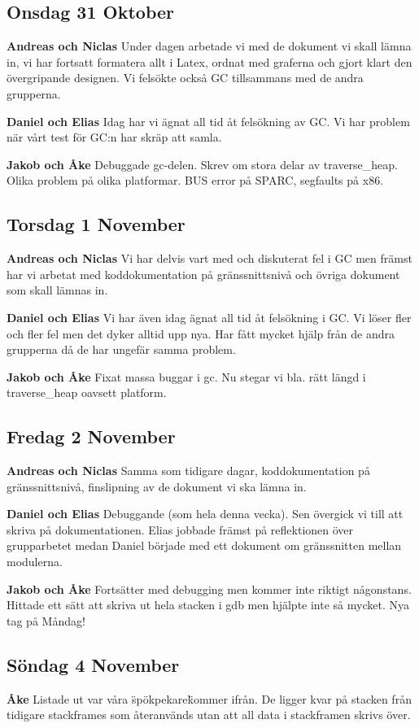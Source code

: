\documentclass{article}
\begin{document}
\subsection{Onsdag 31 Oktober}
{\bf Andreas och Niclas}
Under dagen arbetade vi med de dokument vi skall lämna in, vi har fortsatt formatera allt i Latex, ordnat med graferna och gjort klart den övergripande designen. Vi felsökte också GC tillsammans med de andra grupperna.

{\bf Daniel och Elias}
Idag har vi ägnat all tid åt felsökning av GC. Vi har problem när vårt test för GC:n har skräp att samla.

{\bf Jakob och Åke}
Debuggade gc-delen. Skrev om stora delar av traverse\_heap. Olika problem på olika platformar. BUS error på SPARC, segfaults på x86.

\subsection{Torsdag 1 November}
{\bf Andreas och Niclas} Vi har delvis vart med och diskuterat fel i GC men främst har vi arbetat med koddokumentation på gränssnittsnivå och övriga dokument som skall lämnas in.

{\bf Daniel och Elias} Vi har även idag ägnat all tid åt felsökning i GC. Vi löser fler och fler fel men det dyker alltid upp nya. Har fått mycket hjälp från de andra grupperna då de har ungefär samma problem.

{\bf Jakob och Åke} Fixat massa buggar i gc. Nu stegar vi bla. rätt längd i traverse\_heap oavsett platform.

\subsection{Fredag 2 November}
{\bf Andreas och Niclas} Samma som tidigare dagar, koddokumentation på gränssnittsnivå, finslipning av de dokument vi ska lämna in.

{\bf Daniel och Elias} Debuggande (som hela denna vecka). Sen övergick vi till att skriva på dokumentationen. Elias jobbade främst på reflektionen över grupparbetet medan Daniel började med ett dokument om gränssnitten mellan modulerna.

{\bf Jakob och Åke} Fortsätter med debugging men kommer inte riktigt någonstans. Hittade ett sätt att skriva ut hela stacken i gdb men hjälpte inte så mycket. Nya tag på Måndag!

\subsection{Söndag 4 November}
{\bf Åke} Listade ut var våra \"spökpekare\" kommer ifrån. De ligger kvar på stacken från tidigare stackframes som återanvänds utan att all data i stackframen skrivs över.
\end{document}
